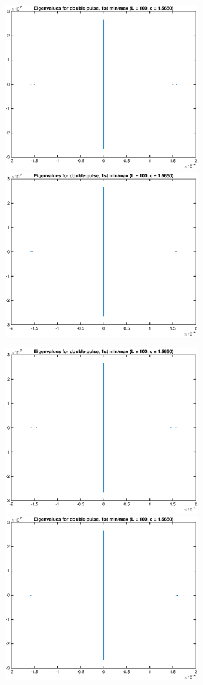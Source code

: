\documentclass[12pt]{article}
\begin{document}
	\begin{figure}[H]
	\includegraphics[width=8.5cm]{L100eigs7.eps}
	\includegraphics[width=8.5cm]{L100eigs8.eps}
	\end{figure}
	\begin{figure}[H]
	\includegraphics[width=8.5cm]{L100eigs9.eps}
	\includegraphics[width=8.5cm]{L100eigs10.eps}
	\end{figure}
\end{document}
